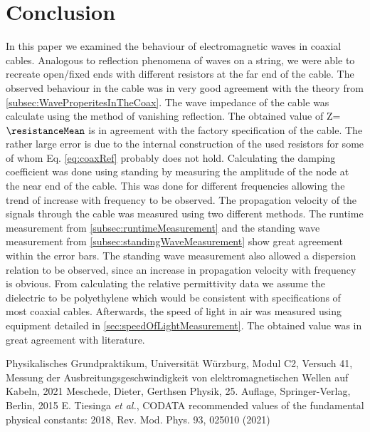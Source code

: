 \documentclass[a4paper,10pt,twocolumn]{article}
\begin{document}
    \section{Conclusion}\label{sec:Conclusion}
    In this paper we examined the behaviour of electromagnetic waves in coaxial cables.
    Analogous to reflection phenomena of waves on a string, we were able to recreate open/fixed ends with different resistors at the far end of the cable.
    The observed behaviour in the cable was in very good agreement with the theory from \ref{subsec:WaveProperitesInTheCoax}.
    The wave impedance of the cable was calculate using the method of vanishing reflection.
    The obtained value of Z=$\resistanceMean$ is in agreement with the factory specification of the cable.
    The rather large error is due to the internal construction of the used resistors for some of whom Eq. \ref{eq:coaxRef} probably does not hold.
    Calculating the damping coefficient was done using standing by measuring the amplitude of the node at the near end of the cable.
    This was done for different frequencies allowing the trend of increase with frequency to be observed.
    The propagation velocity of the signals through the cable was measured using two different methods. 
    The runtime measurement from \ref{subsec:runtimeMeasurement} and the standing wave measurement from \ref{subsec:standingWaveMeasurement} show great agreement within the error bars.
    The standing wave measurement also allowed a dispersion relation to be observed, since an increase in propagation velocity with frequency is obvious.
    From calculating the relative permittivity data we assume the dielectric to be polyethylene which would be consistent with specifications of most coaxial cables.
    Afterwards, the speed of light in air was measured using equipment detailed in \ref{sec:speedOfLightMeasurement}.
    The obtained value was in great agreement with literature.
    \begin{thebibliography}{}    %
         Physikalisches Grundpraktikum, Universität Würzburg, Modul C2, Versuch 41, \grqq Messung der Ausbreitungsgeschwindigkeit
        von elektromagnetischen Wellen auf Kabeln\grqq, 2021
         Meschede, Dieter, Gerthsen Physik, 25. Auflage, Springer-Verlag, Berlin, 2015
         E. Tiesinga \textit{et al.}, \grqq CODATA
        recommended values of the fundamental physical constants: 2018\grqq, Rev. Mod. Phys. 93, 025010 (2021)
        
    \end{thebibliography}
    \newpage
\end{document}
